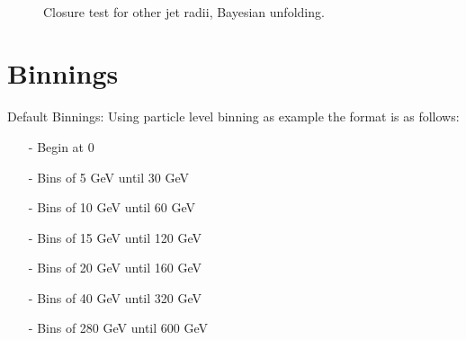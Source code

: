 \documentclass[ALICE]{ALICE_analysis_notes}
\begin{document}
\begin{appendix}
\begin{figure}[h!]
    \qquad
    \\
    \qquad
    \caption{Closure test for other jet radii, Bayesian unfolding.}
    \label{fig:appendixClosureBayes}
\end{figure}

\newpage

\section{Binnings}
\label{sec:appendixSysBinVar}

Default Binnings:
Using particle level binning as example the format is as follows:
\begin{itemize}
    \item[-] Begin at 0
    \item[-] Bins of 5 GeV until 30 GeV
    \item[-] Bins of 10 GeV until 60 GeV
    \item[-] Bins of 15 GeV until 120 GeV
    \item[-] Bins of 20 GeV until 160 GeV
    \item[-] Bins of 40 GeV until 320 GeV
    \item[-] Bins of 280 GeV until 600 GeV
\end{itemize}


\end{appendix}
\end{document}
